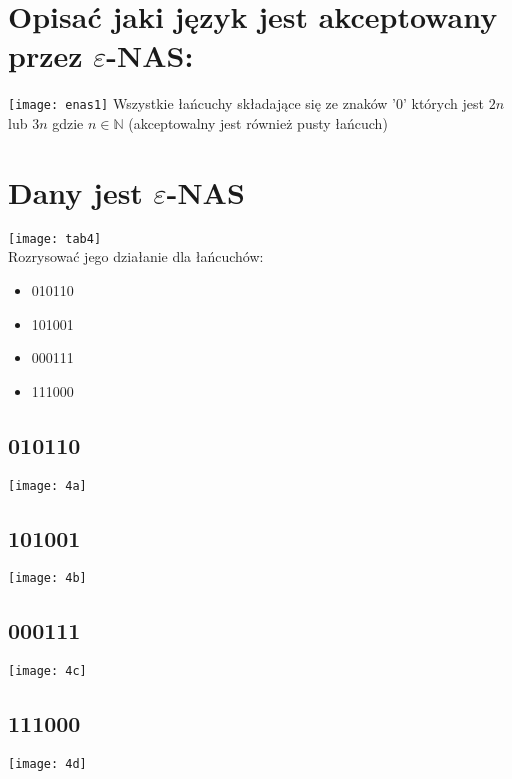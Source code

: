 \documentclass[a4paper,11pt]{article}
\begin{document}
\newpage
\section{Opisać jaki język jest akceptowany przez $\varepsilon$-NAS:}
  \texttt{[image: enas1]}
  \huge
   Wszystkie łańcuchy składające się ze znaków '0'  których jest $2n$ lub $3n$ gdzie $n \in \mathbb{N}$ (akceptowalny jest również pusty łańcuch)

\newpage
\section{Dany jest $\varepsilon$-NAS}
\texttt{[image: tab4]} \\

Rozrysować jego działanie dla łańcuchów:
\begin{itemize}
	\item 010110
    \item 101001
    \item 000111
    \item 111000
\end{itemize}
\subsection{010110}
\begin{center}
	\texttt{[image: 4a]}
\end{center}

\subsection{101001}
\begin{center}
	\texttt{[image: 4b]}
\end{center}

\subsection{000111}
\begin{center}
	\texttt{[image: 4c]}
\end{center}

\subsection{111000}
\begin{center}
	\texttt{[image: 4d]}
\end{center}
\end{document}
